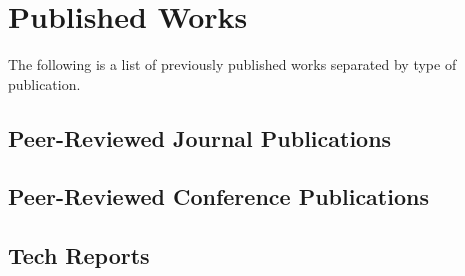 
\chapter{Published Works}

The following is a list of previously published works separated by type of
publication.

%
% 
% 

\section{Peer-Reviewed Journal Publications}


\section{Peer-Reviewed Conference Publications}


\section{Tech Reports}
